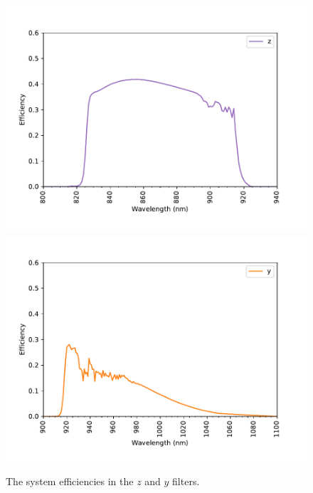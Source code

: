 \begin{figure}
\centering
\includegraphics[width=0.80\linewidth]{figure/system-z.pdf}
\includegraphics[width=0.80\linewidth]{figure/system-y.pdf}
\caption{The system efficiencies in the $z$ and $y$ filters.}
\end{figure}


